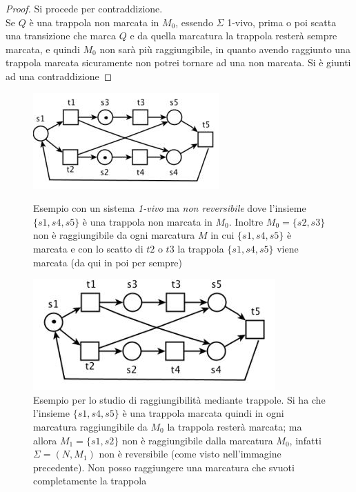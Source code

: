 \documentclass[a4paper,12pt, oneside]{book}
\begin{document}
\begin{proof}
  Si procede per contraddizione.\\
  Se $Q$ è una trappola non marcata in $M_0$, essendo $\Sigma$ 1-vivo, prima o
  poi scatta una transizione che marca $Q$ e da quella marcatura la
  trappola resterà sempre marcata, e quindi $M_0$ non sarà più raggiungibile, in
  quanto avendo raggiunto una trappola marcata sicuramente non potrei tornare ad
  una non marcata. Si è giunti ad una contraddizione
\end{proof}
\begin{figure}[H]
  \centering
  \includegraphics[scale = 0.55]{img/tr.jpg}
  \caption{Esempio con un sistema \emph{1-vivo} ma \emph{non reversibile} dove
    l'insieme $\{s1,s4,s5\}$ è una trappola non marcata in $M_0$. Inoltre
    $M_0=\{s2,s3\}$ non è raggiungibile da ogni marcatura $M$ in cui
    $\{s1,s4,s5\}$ è marcata e con lo scatto di $t2$ o $t3$ la trappola
    $\{s1,s4,s5\}$ viene marcata (da qui in poi per sempre)}
  \includegraphics[scale = 0.55]{img/tr2.jpg}
  \caption{Esempio per lo studio di raggiungibilità mediante trappole. Si ha che
    l'insieme $\{s1,s4,s5\}$ è una trappola marcata quindi in ogni marcatura
    raggiungibile da $M_0$ la trappola resterà marcata; ma allora $M_1=\{s1,s2\}$
    non è raggiungibile dalla marcatura $M_0$, infatti $\Sigma=(N,M_1)$ non è
    reversibile (come visto nell'immagine precedente). Non posso raggiungere una
    marcatura che svuoti completamente la trappola}  
\end{figure}
\end{document}
